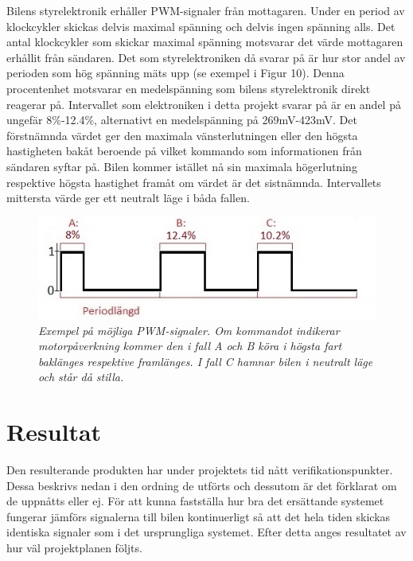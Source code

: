 \documentclass[a4paper]{article}
\begin{document}
Bilens styrelektronik erhåller PWM-signaler från mottagaren. Under en period av klockcykler skickas delvis maximal spänning och delvis ingen spänning alls. Det antal klockcykler som skickar maximal spänning motsvarar det värde mottagaren erhållit från sändaren. Det som styrelektroniken då svarar på är hur stor andel av perioden som hög spänning mäts upp (se exempel i Figur 10). Denna procentenhet motsvarar en medelspänning som bilens styrelektronik direkt reagerar på. Intervallet som elektroniken i detta projekt svarar på är en andel på ungefär 8\%-12.4\%, alternativt en medelspänning på 269mV-423mV. Det förstnämnda värdet ger den maximala vänsterlutningen eller den högsta hastigheten bakåt beroende på vilket kommando som informationen från sändaren syftar på. Bilen kommer istället nå sin maximala högerlutning respektive högsta hastighet framåt om värdet är det sistnämnda. Intervallets mittersta värde ger ett neutralt läge i båda fallen.


\begin{figure}[H]
\includegraphics[scale=1]{PWMsignals.jpg}
\centering
\caption{\it Exempel på möjliga PWM-signaler. Om kommandot indikerar motorpåverkning kommer den i fall A och B köra i högsta fart baklänges respektive framlänges. I fall C hamnar bilen i neutralt läge och står då stilla.}
\end{figure} 




\newpage
\section{Resultat}
Den resulterande produkten har under projektets tid nått verifikationspunkter. Dessa beskrivs nedan i den ordning de utförts och dessutom är det förklarat om de uppnåtts eller ej. För att kunna fastställa hur bra det ersättande systemet fungerar jämförs signalerna till bilen kontinuerligt så att det hela tiden skickas identiska signaler som i det ursprungliga systemet. Efter detta anges resultatet av hur väl projektplanen följts.

\end{document}
